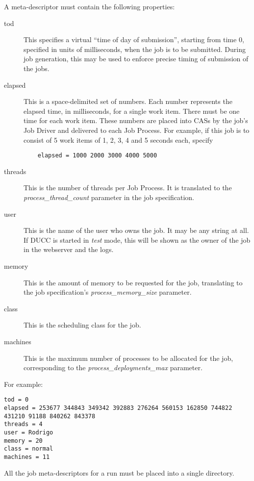      A meta-descriptor must contain the following properties:
     \begin{description}
       \item[tod] This specifies a virtual ``time of day of submission'', starting from time 0, specified
         in units of milliseconds, when the job is to be submitted.  During job generation, this may
         be used to enforce precise timing of submission of the jobs.
       \item[elapsed] This is a space-delimited set of numbers.  Each number represents the elapsed time,
         in milliseconds, for a single work item.  There must be one time for each work item.  
         These numbers are placed into CASs by the job's Job Driver and delivered to each Job Process.
         For example,
         if this job is to consist of 5 work items of 1, 2, 3, 4 and 5 seconds each, specify
\begin{verbatim}
    elapsed = 1000 2000 3000 4000 5000
\end{verbatim}
       \item[threads] This is the number of threads per Job Process.  It is translated to the
         {\em process\_thread\_count} parameter in the job specification.
       \item[user] This is the name of the user who owns the job.  It may be any string at
         all.  If DUCC is started in {\em test} mode, this will be shown as the owner of 
         the job in the webserver and the logs.
       \item[memory] This is the amount of memory to be requested for the job, translating
         to the job specification's {\em process\_memory\_size} parameter.
       \item[class] This is the scheduling class for the job.
       \item[machines] This is the maximum number of processes to be allocated for the
         job, corresponding to the {\em process\_deployments\_max} parameter.
       \end{description}
       
       For example:
\begin{verbatim}
tod = 0
elapsed = 253677 344843 349342 392883 276264 560153 162850 744822 431210 91188 840262 843378 
threads = 4
user = Rodrigo
memory = 20
class = normal
machines = 11
\end{verbatim}

       All the job meta-descriptors for a run must be placed into a single directory.


